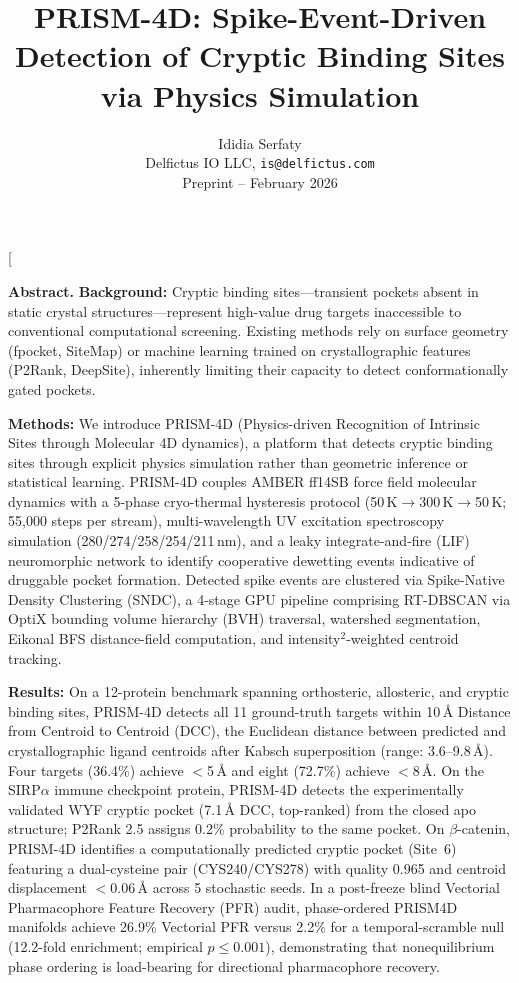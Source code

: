 \documentclass{sn-jnl}
\title{\color{snblue}PRISM-4D: Spike-Event-Driven Detection of Cryptic
Binding Sites via Physics Simulation}
\author{Ididia Serfaty\\
{\small Delfictus IO LLC, \texttt{is@delfictus.com}}\\[2pt]
{\small\color{sngray} Preprint -- February 2026}}
\date{}
\begin{document}
\twocolumn[\maketitle
\begin{center}
\parbox{0.92\textwidth}{\small
\textbf{Abstract.}
\noindent\textbf{Background:}
Cryptic binding sites---transient pockets absent in static crystal structures---represent
high-value drug targets inaccessible to conventional computational screening. Existing
methods rely on surface geometry (fpocket, SiteMap) or machine learning trained on
crystallographic features (P2Rank, DeepSite), inherently limiting their capacity to detect
conformationally gated pockets.

\smallskip\noindent\textbf{Methods:}
We introduce PRISM-4D (Physics-driven Recognition of Intrinsic Sites through Molecular 4D
dynamics), a platform that detects cryptic binding sites through explicit physics simulation
rather than geometric inference or statistical learning. PRISM-4D couples AMBER ff14SB force
field molecular dynamics with a 5-phase cryo-thermal hysteresis protocol
(50\,K$\to$300\,K$\to$50\,K; 55{,}000 steps per stream), multi-wavelength UV excitation
spectroscopy simulation (280/274/258/254/211\,nm), and a leaky integrate-and-fire (LIF)
neuromorphic network to identify cooperative dewetting events indicative of druggable pocket
formation. Detected spike events are clustered via Spike-Native Density Clustering (SNDC), a
4-stage GPU pipeline comprising RT-DBSCAN via OptiX bounding volume hierarchy (BVH)
traversal, watershed segmentation, Eikonal BFS distance-field computation, and
intensity$^2$-weighted centroid tracking.

\smallskip\noindent\textbf{Results:}
On a 12-protein benchmark spanning orthosteric, allosteric, and cryptic binding sites,
PRISM-4D detects all 11 ground-truth targets within 10\,\AA{} Distance from Centroid to
Centroid (DCC), the Euclidean distance between predicted and crystallographic ligand centroids
after Kabsch superposition (range: 3.6--9.8\,\AA{}). Four targets (36.4\%) achieve $<$5\,\AA{}
and eight (72.7\%) achieve $<$8\,\AA{}. On the SIRP$\alpha$ immune checkpoint protein,
PRISM-4D detects the experimentally validated WYF cryptic pocket (7.1\,\AA{} DCC, top-ranked)
from the closed apo structure; P2Rank 2.5 assigns 0.2\% probability to the same pocket. On
$\beta$-catenin, PRISM-4D identifies a computationally predicted cryptic pocket (Site~6)
featuring a dual-cysteine pair (CYS240/CYS278) with quality 0.965 and centroid displacement
$<$0.06\,\AA{} across 5 stochastic seeds. In a post-freeze blind Vectorial Pharmacophore
Feature Recovery (PFR) audit, phase-ordered PRISM4D manifolds achieve 26.9\% Vectorial PFR
versus 2.2\% for a temporal-scramble null (12.2-fold enrichment; empirical $p \leq 0.001$),
demonstrating that nonequilibrium phase ordering is load-bearing for directional pharmacophore
recovery.

}
\end{center}
\end{document}
